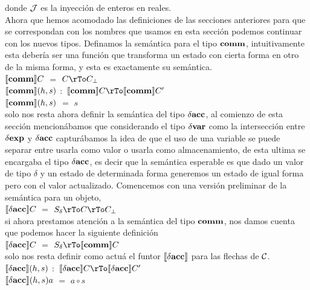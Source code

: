 \noindent
donde $\mathcal{J}$ es la inyecci\'on de enteros en reales.\\

Ahora que hemos acomodado las definiciones de las secciones anteriores para
que se correspondan con los nombres que usamos en esta secci\'on podemos 
continuar con los nuevos tipos. Definamos la sem\'antica para el tipo $\textbf{comm}$,
intuitivamente esta deber\'ia ser una funci\'on que transforma un estado
con cierta forma en otro de la misma forma, y esta es exactamente su sem\'antica.\\

\noindent
$\llbracket  \textbf{comm}  \rrbracket C$ $=$ $C \rTo C_\bot$\\
$\llbracket  \textbf{comm}  \rrbracket(h,s)$ $:$ $\semBrcks{ \commt }C \rTo \semBrcks{ \commt }C'$\\
$\llbracket  \textbf{comm}  \rrbracket(h,s)$ $=$ $s$\\

\noindent
solo nos resta ahora definir la sem\'antica del tipo $\delta \textbf{acc}$, al comienzo 
de esta secci\'on mencion\'abamos que considerando el tipo $\delta \textbf{var}$ como
la intersecci\'on entre $\delta \textbf{exp}$ y $\delta \textbf{acc}$ captur\'abamos la idea
de que el uso de una variable se puede separar entre usarla como valor
o usarla como almacenamiento, de esta ultima se encargaba el tipo $\delta \textbf{acc}$,
es decir que la sem\'antica esperable es que dado un valor de tipo $\delta$ y un
estado de determinada forma generemos un estado de igual forma pero con el 
valor actualizado. Comencemos con una versi\'on preliminar de la sem\'antica
para un objeto,\\

\noindent
$\llbracket  \delta \textbf{acc}  \rrbracket C$ $=$ $S_{\delta} \rTo C \rTo C_\bot$\\

\noindent
si ahora prestamos atenci\'on a la sem\'antica del tipo $\textbf{comm}$, nos damos
cuenta que podemos hacer la siguiente definici\'on\\

\noindent
$\llbracket  \delta \textbf{acc}  \rrbracket C$ $=$ $S_{\delta} \rTo \semBrcks{ \commt }C$\\

\noindent
solo nos resta definir como actu\'a el funtor $\llbracket  \delta \textbf{acc}  \rrbracket$ para
las flechas de $\mathcal{C}$. \\

\noindent
$\llbracket  \delta \textbf{acc}  \rrbracket(h,s)$ $:$ $\semBrcks{ \deltaacc }C \rTo \semBrcks{ \deltaacc }C'$\\
$\llbracket  \delta \textbf{acc}  \rrbracket(h,s)a$ $=$ $a \circ s$\\

